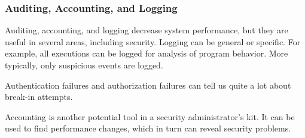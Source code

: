 \subsubsection{Auditing, Accounting, and Logging}\label{subsubsec:Auditing_Accounting_Logging}
Auditing, accounting, and logging decrease system performance, but they are useful in several areas, including security.
Logging can be general or specific.
For example, all  executions can be logged for analysis of program behavior.
More typically, only suspicious events are logged.

Authentication failures and authorization failures can tell us quite a lot about break-in attempts.

Accounting is another potential tool in a security administrator’s kit.
It can be used to find performance changes, which in turn can reveal security problems.

